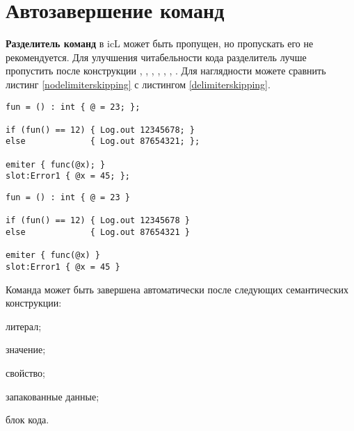 \section{Автозавершение команд}

\textbf{Разделитель команд} в icL может быть пропущен, но пропускать его не рекомендуется. Для улучшения читабельности кода разделитель лучше пропустить после конструкции , , , , , , . Для наглядности можете сравнить листинг \ref{nodelimiterskipping} с листингом \ref{delimiterskipping}.

\begin{lstlisting}[caption=Без пропущенных разделители, label=nodelimiterskipping]
fun = () : int { @ = 23; };

if (fun() == 12) { Log.out 12345678; } 
else             { Log.out 87654321; };

emiter { func(@x); }
slot:Error1 { @x = 45; };
\end{lstlisting}

\begin{lstlisting}[caption=С пропущенными разделителями, label=delimiterskipping]
fun = () : int { @ = 23 }

if (fun() == 12) { Log.out 12345678 } 
else             { Log.out 87654321 }

emiter { func(@x) }
slot:Error1 { @x = 45 }
\end{lstlisting}

Команда может быть завершена автоматически после следующих семантических конструкции:
\begin{icItems}
	\item литерал;
	\item значение;
	\item свойство;
	\item запакованные данные;
	\item блок кода.
\end{icItems}